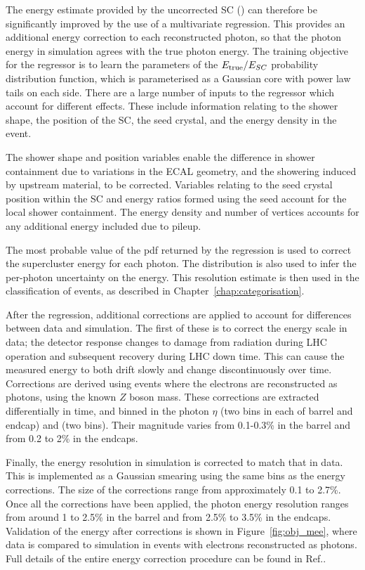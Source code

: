 The energy estimate provided by the uncorrected SC (\Eraw) can therefore be significantly improved by the use of a multivariate regression.
This provides an additional energy correction to each reconstructed photon, so that the photon energy in simulation agrees with the true photon energy.
The training objective for the regressor is to learn the parameters of the $E_{\mathrm{true}}/E_{SC}$ probability distribution function, 
which is parameterised as a Gaussian core with power law tails on each side. %
There are a large number of inputs to the regressor which account for different effects.
These include information relating to the shower shape, the position of the SC, the seed crystal, and the energy density in the event.

The shower shape and position variables enable the difference in shower containment due to variations in the ECAL geometry, 
and the showering induced by upstream material, to be corrected.
Variables relating to the seed crystal position within the SC and energy ratios formed using the seed account for the local shower containment.
The energy density and number of vertices accounts for any additional energy included due to pileup.

The most probable value of the pdf returned by the regression is used to correct the supercluster energy for each photon.
The distribution is also used to infer the per-photon uncertainty on the energy.
This resolution estimate is then used in the classification of events, as described in Chapter~\ref{chap:categorisation}.

After the regression, additional corrections are applied to account for differences between data and simulation.
The first of these is to correct the energy scale in data;
the detector response changes to damage from radiation during LHC operation and subsequent recovery during LHC down time.
This can cause the measured energy to both drift slowly and change discontinuously over time.
Corrections are derived using \Zee events where the electrons are reconstructed as photons, using the known $Z$ boson mass.
These corrections are extracted differentially in time, and binned in the photon $\eta$ (two bins in each of barrel and endcap) and \RNINE (two bins).
Their magnitude varies from 0.1-0.3\% in the barrel and from 0.2 to 2\% in the endcaps.

Finally, the energy resolution in simulation is corrected to match that in data.
This is implemented as a Gaussian smearing using the same bins as the energy corrections.
The size of the corrections range from approximately 0.1 to 2.7\%.
Once all the corrections have been applied, the photon energy resolution ranges from around 1 to 2.5\% in the barrel
and from 2.5\% to 3.5\% in the endcaps.
Validation of the energy after corrections is shown in Figure~\ref{fig:obj_mee}, 
where data is compared to simulation in \Zee events with electrons reconstructed as photons.
Full details of the entire energy correction procedure can be found in Ref.\cite{PhotonReco}.

